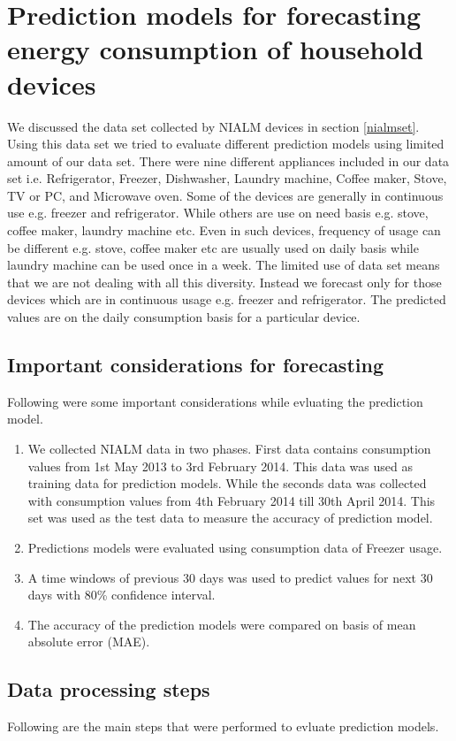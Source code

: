 \section{Prediction models for forecasting energy consumption of household devices}
We discussed the data set collected by NIALM devices in section \ref{nialmset}. Using this data set we tried to evaluate different prediction models using limited amount of our data set. There were nine different appliances included in our data set i.e. Refrigerator, Freezer, Dishwasher, Laundry machine, Coffee maker, Stove, TV or PC, and Microwave oven. Some of the devices are generally in continuous use e.g. freezer and refrigerator. While others are use on need basis e.g. stove, coffee maker, laundry machine etc. Even in such devices, frequency of usage can be different e.g. stove, coffee maker etc are usually used on daily basis while laundry machine can be used once in a week. The limited use of data set means that we are not dealing with all this diversity. Instead we forecast only for those devices which are in continuous usage e.g. freezer and refrigerator. The predicted values are on the daily consumption basis for a particular device.  
\subsection{Important considerations for forecasting}
Following were some important considerations while evluating the prediction model.
\begin{enumerate}
\item We collected NIALM data in two phases. First data contains consumption values from 1st May 2013 to 3rd February 2014. This data was used as training data for prediction models. While the seconds data was collected with consumption values from 4th February 2014 till 30th April 2014. This set was used as the test data to measure the accuracy of prediction model.
\item Predictions models were evaluated using consumption data of Freezer usage.
\item A time windows of previous 30 days was used to predict values for next 30 days with 80\% confidence interval.
\item  The accuracy of the prediction models were compared on basis of mean absolute error (MAE).
\end{enumerate}     

\subsection{Data processing steps}
Following are the main steps that were performed to evluate prediction models.

